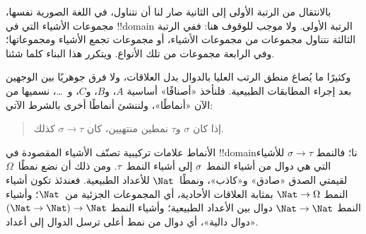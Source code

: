 \documentclass[../../../include/open-logic-section]{subfiles}
\begin{document}


بالانتقال من الرتبة الأولى إلى الثانية صار لنا أن نتناول، في
اللغة الصورية نفسها، مجموعات الأشياء التي في !!{domain}
الرتبة الأولى. ولا موجب للوقوف هنا: ففي الرتبة الثالثة نتناول
مجموعات من مجموعات الأشياء، أو مجموعات تجمع الأشياء ومجموعاتها؛
وفي الرابعة مجموعات من تلك الأنواع. ويتكرر هذا البناء كلما شئنا.

وكثيرًا ما يُصاغ منطق الرتب العليا بالدوال بدل العلاقات، ولا
فرق جوهريًا بين الوجهين بعد إجراء المطابقات الطبيعية. فلنأخذ
«أصنافًا» أساسية $A$، و$B$، و$C$، و~\dots، نسميها من الآن
«أنماطًا»، ولننشئ أنماطًا أخرى بالشرط الآتي:
\begin{quote}
إذا كان $\sigma$ و$\tau$ نمطين منتهيين، كان $\sigma \to \tau$ كذلك.
\end{quote}
الأنماط علامات تركيبية تصنّف الأشياء المقصودة في
!!{domain}نا؛ فالنمط $\sigma \to \tau$ للأشياء التي هي دوال
من أشياء النمط~$\sigma$ إلى أشياء النمط~$\tau$. ومن ذلك أن
نضع نمطًا~$\Omega$ لقيمتي الصدق «صادق» و«كاذب»، ونمطًا~$\Nat$
للأعداد الطبيعية. فعندئذ تكون أشياء النمط $\Nat \to \Omega$
بمثابة العلاقات الأحادية، أي المجموعات الجزئية من~$\Nat$؛
وأشياء النمط $\Nat \to
\Nat$ دوال بين الأعداد الطبيعية؛ وأشياء النمط
$(\Nat \to \Nat) \to \Nat$ «دوال دالية»، أي دوال من نمط أعلى
ترسل الدوال إلى أعداد.
\end{document}
